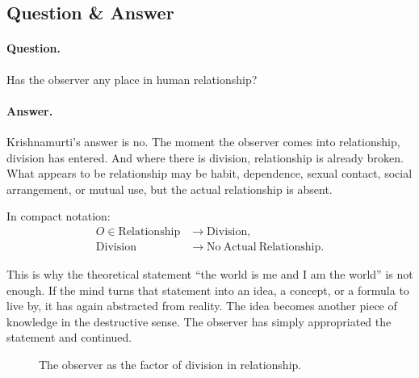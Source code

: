 \subsection{Question \& Answer}

\paragraph{Question.}
Has the observer any place in human relationship?

\paragraph{Answer.}
Krishnamurti's answer is no. The moment the observer comes into relationship, division has entered. And where there is division, relationship is already broken. What appears to be relationship may be habit, dependence, sexual contact, social arrangement, or mutual use, but the actual relationship is absent.

In compact notation:
\begin{align}
O \in \mathrm{Relationship}
&\longrightarrow \mathrm{Division},\\
\mathrm{Division}
&\longrightarrow \mathrm{No\ Actual\ Relationship}.
\end{align}

This is why the theoretical statement ``the world is me and I am the world'' is not enough. If the mind turns that statement into an idea, a concept, or a formula to live by, it has again abstracted from reality. The idea becomes another piece of knowledge in the destructive sense. The observer has simply appropriated the statement and continued.

\begin{figure}
\centering
{}
\caption{The observer as the factor of division in relationship.}
\end{figure}

